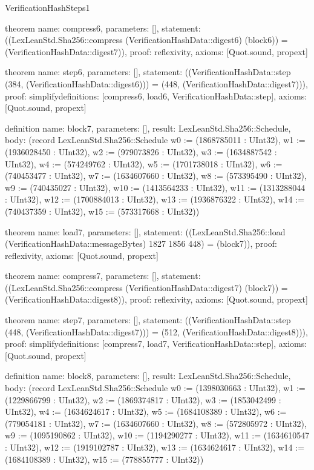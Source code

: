 \begin{lexlean}{VerificationHashSteps1}
\begin{semanticmodule}
theorem{
  name: compress6,
  parameters: [],
  statement: ((LexLeanStd.Sha256::compress (VerificationHashData::digest6) (block6)) = (VerificationHashData::digest7)),
  proof: reflexivity{},
  axioms: [Quot.sound, propext]
}

theorem{
  name: step6,
  parameters: [],
  statement: ((VerificationHashData::step (384, (VerificationHashData::digest6))) = (448, (VerificationHashData::digest7))),
  proof: simplify{definitions: [compress6, load6, VerificationHashData::step]},
  axioms: [Quot.sound, propext]
}

definition{
  name: block7,
  parameters: [],
  result: LexLeanStd.Sha256::Schedule,
  body: (record LexLeanStd.Sha256::Schedule {w0 := (1868785011 : UInt32), w1 := (1936028450 : UInt32), w2 := (979073826 : UInt32), w3 := (1634887542 : UInt32), w4 := (574249762 : UInt32), w5 := (1701738018 : UInt32), w6 := (740453477 : UInt32), w7 := (1634607660 : UInt32), w8 := (573395490 : UInt32), w9 := (740435027 : UInt32), w10 := (1413564233 : UInt32), w11 := (1313288044 : UInt32), w12 := (1700884013 : UInt32), w13 := (1936876322 : UInt32), w14 := (740437359 : UInt32), w15 := (573317668 : UInt32)})
}

theorem{
  name: load7,
  parameters: [],
  statement: ((LexLeanStd.Sha256::load (VerificationHashData::messageBytes) 1827 1856 448) = (block7)),
  proof: reflexivity{},
  axioms: [Quot.sound, propext]
}

theorem{
  name: compress7,
  parameters: [],
  statement: ((LexLeanStd.Sha256::compress (VerificationHashData::digest7) (block7)) = (VerificationHashData::digest8)),
  proof: reflexivity{},
  axioms: [Quot.sound, propext]
}

theorem{
  name: step7,
  parameters: [],
  statement: ((VerificationHashData::step (448, (VerificationHashData::digest7))) = (512, (VerificationHashData::digest8))),
  proof: simplify{definitions: [compress7, load7, VerificationHashData::step]},
  axioms: [Quot.sound, propext]
}

definition{
  name: block8,
  parameters: [],
  result: LexLeanStd.Sha256::Schedule,
  body: (record LexLeanStd.Sha256::Schedule {w0 := (1398030663 : UInt32), w1 := (1229866799 : UInt32), w2 := (1869374817 : UInt32), w3 := (1853042499 : UInt32), w4 := (1634624617 : UInt32), w5 := (1684108389 : UInt32), w6 := (779054181 : UInt32), w7 := (1634607660 : UInt32), w8 := (572805972 : UInt32), w9 := (1095190862 : UInt32), w10 := (1194290277 : UInt32), w11 := (1634610547 : UInt32), w12 := (1919102787 : UInt32), w13 := (1634624617 : UInt32), w14 := (1684108389 : UInt32), w15 := (778855777 : UInt32)})
}


\end{semanticmodule}
\end{lexlean}
